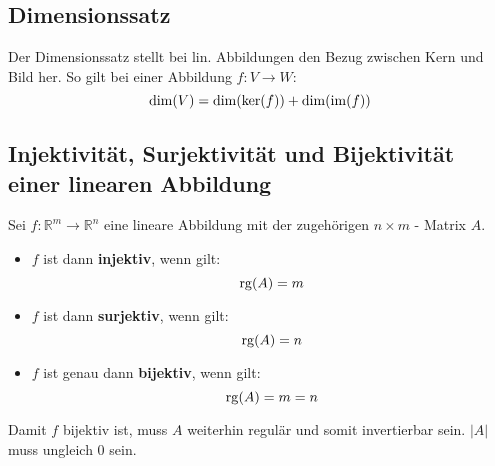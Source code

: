 \subsection{Dimensionssatz}
\label{sub:dimensionssatz}

Der Dimensionssatz stellt bei lin. Abbildungen den Bezug zwischen Kern und Bild her.
So gilt bei einer Abbildung $f : V \rightarrow W$:
\begin{equation}
	\dim(V) = \dim(\ker(f)) + \dim(\operatorname{im}(f))
\end{equation}

\subsection{Injektivit\"{a}t, Surjektivit\"{a}t und Bijektivit\"{a}t einer linearen Abbildung}
\label{sub:injektivitaet_surjektivitaet_und_bijektivitaet_einer_linearen_abbildung}

Sei $f : \mathbb{R}^m \rightarrow \mathbb{R}^n$ eine lineare Abbildung mit der zugehörigen $n \times m$ - Matrix $A$.

\begin{itemize}
	\item $f$ ist dann \textbf{injektiv}, wenn gilt: \begin{equation} \operatorname{rg}(A) = m \end{equation}
	\item $f$ ist dann \textbf{surjektiv}, wenn gilt: \begin{equation} \operatorname{rg}(A) = n \end{equation}
	\item $f$ ist genau dann \textbf{bijektiv}, wenn gilt: \begin{equation} \operatorname{rg}(A) = m = n\end{equation}
\end{itemize}

Damit $f$ bijektiv ist, muss $A$ weiterhin regulär und somit invertierbar sein. $|A|$ muss ungleich $0$ sein.